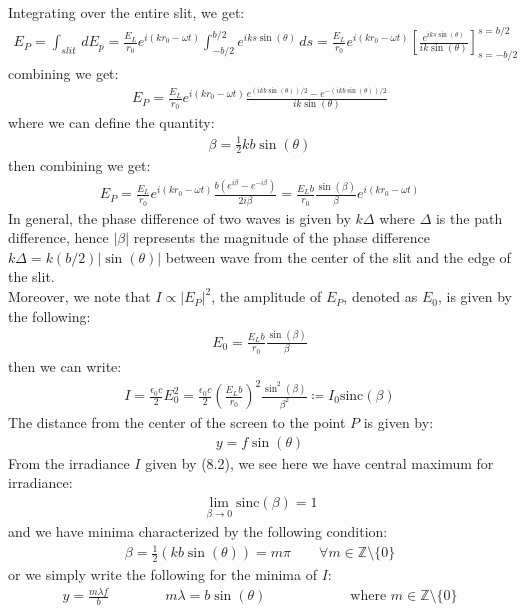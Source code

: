 \documentclass[11pt]{book}
\theoremstyle{break}
\theoremstyle{break}
\newcommand{\Z}{\mathbb{Z}}
\begin{document}
Integrating over the entire slit, we get:
\begin{align*}
E_P = \int_{slit}\, dE_p = \frac{E_L}{r_0}e^{i(kr_0-\omega t)}\int_{-b/2}^{b/2}e^{iks\sin(\theta)}\, ds = \frac{E_L}{r_0}e^{i(kr_0 - \omega t)}\left[ \frac{e^{iks\sin(\theta)}}{ik \sin(\theta)}\right]_{s=-b/2}^{s=b/2}
\end{align*}
combining we get:
\begin{align*}
E_P = \frac{E_L}{r_0}e^{i(kr_0 -\omega t)}\frac{e^{(ikb\sin(\theta))/2}-e^{-(ikb\sin(\theta))/2}}{ik\sin(\theta)}
\end{align*}
where we can define the quantity:
\begin{align*}
\beta = \frac{1}{2}kb\sin(\theta)
\end{align*}
then combining we get:
\begin{align*}
E_P = \frac{E_L}{r_0}e^{i(kr_0 - \omega t)}\frac{b(e^{i\beta}-e^{-i\beta})}{2i\beta} = \frac{E_Lb}{r_0}\frac{\sin(\beta)}{\beta}e^{i(kr_0-\omega t)}
\end{align*}
In general, the phase difference of two waves is given by $k\Delta$ where $\Delta$ is the path difference, hence $|\beta|$ represents the magnitude of the phase difference $k\Delta = k (b/2) |\sin(\theta)|$ between wave from the center of the slit and the edge of the slit.\\


Moreover, we note that $I \propto |E_P|^2$, the amplitude of $E_P$, denoted as $E_0$, is given by the following:
\begin{align*}
E_0 = \frac{E_L b}{r_0} \frac{\sin(\beta)}{\beta}
\end{align*}
then we can write:
\begin{align}
I = \frac{\epsilon_0 c}{2}E_0^2 = \frac{\epsilon_0 c}{2}\left(\frac{E_L b}{r_0}\right)^2 \frac{\sin^2(\beta)}{\beta^2} \coloneqq I_0 \text{sinc}(\beta)
\end{align}
The distance from the center of the screen to the point $P$ is given by:
\begin{align*}
y = f \sin(\theta)
\end{align*}
From the irradiance $I$ given by (8.2), we see here we have central maximum for irradiance:
\begin{align*}
\lim_{\beta \to 0} \text{sinc}(\beta) = 1
\end{align*}
and we have minima characterized by the following condition:
\begin{align*}
\beta = \frac{1}{2}(kb \sin(\theta)) = m\pi \qquad \forall m\in \Z\setminus \{0\}
\end{align*}
or we simply write the following for the minima of $I$:
\begin{align*}
y=\frac{m\lambda f}{b}\qquad \qquad m\lambda = b\sin(\theta) \qquad \qquad\qquad \text{where } m \in \Z \setminus \{0\}
\end{align*}
\end{document}
